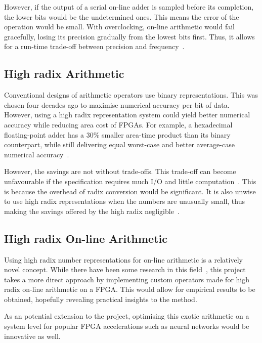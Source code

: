 However, if the output of a serial on-line adder is sampled before its
completion, the lower bits would be the undetermined ones.
This means the error of the operation would be small.
With overclocking, on-line arithmetic would fail gracefully, losing its
precision gradually from the lowest bits first.
Thus, it allows for a run-time trade-off between precision and
frequency~\cite{Shi2}.

\subsection{High radix Arithmetic}
Conventional designs of arithmetic operators use binary representations.
This was chosen four decades ago to maximise numerical accuracy per bit of data.
However, using a high radix representation system could yield better numerical
accuracy while reducing area cost of FPGAs.
For example, a hexadecimal floating-point adder has a 30\% smaller area-time
product than its binary counterpart, while still delivering equal worst-case
and better average-case numerical accuracy~\cite{Catanzaro1}.

However, the savings are not without trade-offs.
This trade-off can become unfavourable if the specification requires much I/O
and little computation~\cite{Whyte1}.
This is because the overhead of radix conversion would be significant.
It is also unwise to use high radix representations when the numbers are
unusually small, thus making the savings offered by the high radix
negligible~\cite{Catanzaro1}.

\subsection{High radix On-line Arithmetic}
Using high radix number representations for on-line arithmetic is a
relatively novel concept.
While there have been some research in this field~\cite{Lynch1}\cite{Lynch2},
this project takes a more direct approach by implementing custom operators
made for high radix on-line arithmetic on a FPGA.
This would allow for empirical results to be obtained, hopefully revealing
practical insights to the method.

As an potential extension to the project, optimising this exotic arithmetic
on a system level for popular FPGA accelerations such as neural networks would
be innovative as well.